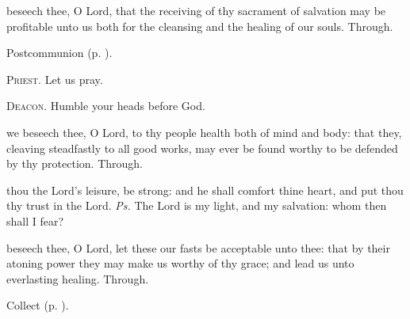 
\vspace{-0.25\baselineskip}

\postcommunion

\vspace{-0.08\baselineskip}

 beseech thee, O Lord, that the receiving of thy sacrament of salvation may be profitable unto us both for the cleansing and the healing of our souls. Through.
\begin{rubric}
     Postcommunion  (p. \pageref{AshWednesdayMassPostcommunion}).
\end{rubric}

\textsc{Priest.} Let us pray.\par
\textsc{Deacon.} Humble your heads before God.\par
{} we beseech thee, O Lord, to thy people health both of mind and body: that they, cleaving steadfastly to all good works, may ever be found worthy to be defended by thy protection. Through.


\introit
{} thou the Lord's leisure, be strong: and he shall comfort thine heart, and put thou thy trust in the Lord. \textit{Ps.} The Lord is my light, and my salvation: whom then shall I fear?

\collect
{} beseech thee, O Lord, let these our fasts be acceptable unto thee: that by their atoning power they may make us worthy of thy grace; and lead us unto everlasting healing. Through.
\begin{rubric}
     Collect  (p. \pageref{AshWednesdayMassCollect}).
\end{rubric}

